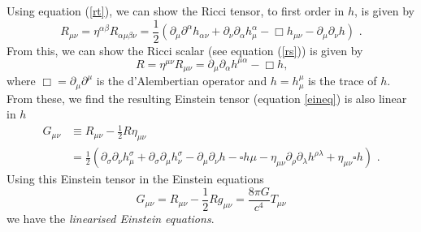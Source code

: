 \documentclass[11pt]{cuthesis}
\newcommand{\mn}{_{\mu\nu}}
\newcommand{\fs}{\text{ .}}
\newcommand{\pd}{\partial}
\begin{document}
Using equation (\ref{rt}), we can show the Ricci tensor, to first order in $h$, is given by
\begin{equation} \label{lin rt}
R\mn =\eta^{\alpha \beta}R_{\alpha \mu \beta \nu} = \frac{1}{2}\left( \pd_\mu \pd ^\alpha h_{\alpha \nu} + \pd_\nu \pd_\alpha h^\alpha_\mu -\Box h\mn -\pd_\mu \pd_\nu h \right) \fs
\end{equation}
From this, we can show the Ricci scalar (see equation (\ref{rs})) is given by
\begin{equation} \label{lin rs}
R=\eta^{\mu \nu}R\mn=\pd _\mu \pd_ \alpha h^{\mu \alpha} - \Box h \textbf{,}
\end{equation}
where $\Box=\pd_\mu \pd^\mu $ is the d'Alembertian operator and $h=h^\mu_\mu$ is the trace of $h$. From these, we find the resulting Einstein tensor (equation \ref{eineq}) is also linear in $h$ 
\begin{equation} \label{lin Einstein}
\begin{split}
G\mn & \equiv R\mn -\frac{1}{2} R \eta\mn \\
 & = \frac{1}{2} ( \partial_\sigma \partial_\nu h^\sigma_\mu + \partial_\sigma \partial_\mu h^\sigma_\nu - \partial_\mu \partial_\nu h - \square h\mu -\eta\mn \partial_\rho \partial_\lambda h^{\rho \lambda} + \eta\mn \square h ) \fs
\end{split}
\end{equation}
Using this Einstein tensor in the Einstein equations 
\begin{equation}
G\mn =R\mn -\frac{1}{2} R g\mn=\frac{8 \pi G}{c^4}T\mn
\end{equation}
we have the \textit{linearised Einstein equations}.
\end{document}
